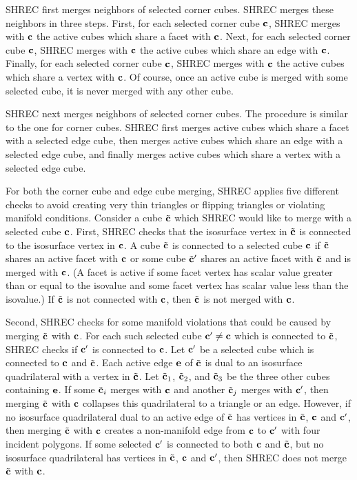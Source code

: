 SHREC first merges neighbors of selected corner cubes.
SHREC merges these neighbors in three steps.
First, for each selected corner cube $\mathbf{c}$,
SHREC merges with $\mathbf{c}$ the active cubes which share a facet with $\mathbf{c}$.
Next, for each selected corner cube $\mathbf{c}$,
SHREC merges with $\mathbf{c}$ the active cubes which share an edge with $\mathbf{c}$.
Finally, for each selected corner cube $\mathbf{c}$,
SHREC merges with $\mathbf{c}$ the active cubes which share a vertex with $\mathbf{c}$.
Of course, once an active cube is merged with some selected cube,
it is never merged with any other cube.

SHREC next merges neighbors of selected corner cubes.
The procedure is similar to the one for corner cubes.
SHREC first merges active cubes which share a facet with a selected edge cube,
then merges active cubes which share an edge with a selected edge cube,
and finally merges active cubes which share a vertex 
with a selected edge cube.

For both the corner cube and edge cube merging,
SHREC applies five different checks to avoid creating very thin triangles
or flipping triangles or violating manifold conditions.
Consider a cube ${\tilde{\mathbf{c}}}$ which SHREC would like to merge 
with a selected cube $\mathbf{c}$.
First, SHREC checks that the isosurface vertex in ${\tilde{\mathbf{c}}}$
is connected to the isosurface vertex in $\mathbf{c}$.
A cube ${\tilde{\mathbf{c}}}$ is connected to a selected cube $\mathbf{c}$
if ${\tilde{\mathbf{c}}}$ shares an active facet with $\mathbf{c}$
or some cube ${\tilde{\mathbf{c}}}'$ shares an active facet with ${\tilde{\mathbf{c}}}$ and
is merged with $\mathbf{c}$.
(A facet is active if some facet vertex has scalar value greater than
or equal to the isovalue and some facet vertex has scalar value less
than the isovalue.)
If ${\tilde{\mathbf{c}}}$ is not connected with $\mathbf{c}$, then ${\tilde{\mathbf{c}}}$ is not merged with $\mathbf{c}$.

Second, SHREC checks for some manifold violations that
could be caused by merging ${\tilde{\mathbf{c}}}$ with $\mathbf{c}$.
For each such selected cube $\mathbf{c}' \neq \mathbf{c}$ which is connected to ${\tilde{\mathbf{c}}}$,
SHREC checks if $\mathbf{c}'$ is connected to $\mathbf{c}$.
Let $\mathbf{c}'$ be a selected cube which is connected to $\mathbf{c}$ and ${\tilde{\mathbf{c}}}$.
Each active edge $\mathbf{e}$ of ${\tilde{\mathbf{c}}}$ is dual to an isosurface quadrilateral
with a vertex in ${\tilde{\mathbf{c}}}$.
Let ${\tilde{\mathbf{c}}}_1$, ${\tilde{\mathbf{c}}}_2$, and ${\tilde{\mathbf{c}}}_3$ be the three other cubes containing $\mathbf{e}$.
If some ${\tilde{\mathbf{c}}}_i$ merges with $\mathbf{c}$ and another ${\tilde{\mathbf{c}}}_j$ merges with $\mathbf{c}'$,
then merging ${\tilde{\mathbf{c}}}$ with $\mathbf{c}$ collapses this quadrilateral to a triangle
or an edge.
However, if no isosurface quadrilateral dual to an active edge of ${\tilde{\mathbf{c}}}$
has vertices in ${\tilde{\mathbf{c}}}$, $\mathbf{c}$ and $\mathbf{c}'$,
then merging ${\tilde{\mathbf{c}}}$ with $\mathbf{c}$ creates a non-manifold edge 
from $\mathbf{c}$ to $\mathbf{c}'$ with four incident polygons.
If some selected $\mathbf{c}'$ is connected to both $\mathbf{c}$ and ${\tilde{\mathbf{c}}}$,
but no isosurface quadrilateral has vertices in ${\tilde{\mathbf{c}}}$, $\mathbf{c}$ and $\mathbf{c}'$,
then SHREC does not merge ${\tilde{\mathbf{c}}}$ with $\mathbf{c}$.


